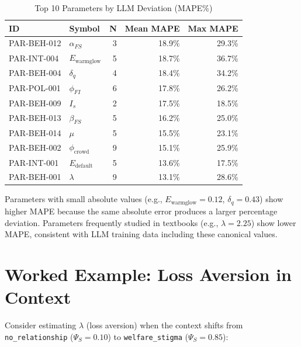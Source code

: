 \begin{table}[htbp]
\centering
\caption{Top 10 Parameters by LLM Deviation (MAPE\%)}
\label{tab:tla-params}
\begin{tabular}{llrrr}
\toprule
\textbf{ID} & \textbf{Symbol} & \textbf{N} & \textbf{Mean MAPE} & \textbf{Max MAPE} \\
\midrule
PAR-BEH-012 & $\alpha_{FS}$ & 3  & 18.9\% & 29.3\% \\
PAR-INT-004  & $E_{\text{warmglow}}$ & 5 & 18.7\% & 36.7\% \\
PAR-BEH-004  & $\delta_q$ & 4  & 18.4\% & 34.2\% \\
PAR-POL-001  & $\phi_{FI}$ & 6  & 17.8\% & 26.2\% \\
PAR-BEH-009  & $I_s$ & 2     & 17.5\% & 18.5\% \\
PAR-BEH-013  & $\beta_{FS}$ & 5 & 16.2\% & 25.0\% \\
PAR-BEH-014  & $\mu$ & 5      & 15.5\% & 23.1\% \\
PAR-BEH-002  & $\phi_{\text{crowd}}$ & 9 & 15.1\% & 25.9\% \\
PAR-INT-001  & $E_{\text{default}}$ & 5  & 13.6\% & 17.5\% \\
PAR-BEH-001  & $\lambda$ & 9  & 13.1\% & 28.6\% \\
\bottomrule
\end{tabular}
\end{table}

Parameters with small absolute values (e.g., $E_{\text{warmglow}} = 0.12$,
$\delta_q = 0.43$) show higher MAPE because the same absolute error
produces a larger percentage deviation. Parameters frequently studied in
textbooks (e.g., $\lambda = 2.25$) show lower MAPE, consistent with
LLM training data including these canonical values.



\section{Worked Example: Loss Aversion in Context}
\label{sec:lb-example}

Consider estimating $\lambda$ (loss aversion) when the context shifts from
\texttt{no\_relationship} ($\Psi_S = 0.10$) to \texttt{welfare\_stigma}
($\Psi_S = 0.85$):

